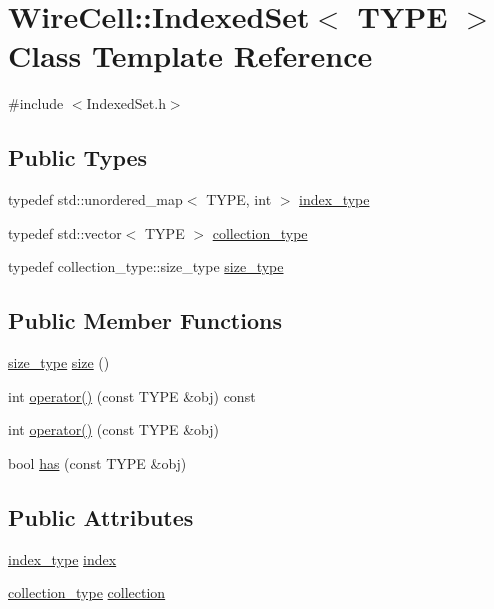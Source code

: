 \hypertarget{class_wire_cell_1_1_indexed_set}{}\section{Wire\+Cell\+:\+:Indexed\+Set$<$ T\+Y\+PE $>$ Class Template Reference}
\label{class_wire_cell_1_1_indexed_set}


{\ttfamily \#include $<$Indexed\+Set.\+h$>$}

\subsection*{Public Types}
\begin{DoxyCompactItemize}
\item 
typedef std\+::unordered\+\_\+map$<$ T\+Y\+PE, int $>$ \hyperlink{class_wire_cell_1_1_indexed_set_ad9f54ba896d3c199df2cc233f16c5327}{index\+\_\+type}
\item 
typedef std\+::vector$<$ T\+Y\+PE $>$ \hyperlink{class_wire_cell_1_1_indexed_set_afd3398c28ed5729c35664d26d6249ed4}{collection\+\_\+type}
\item 
typedef collection\+\_\+type\+::size\+\_\+type \hyperlink{class_wire_cell_1_1_indexed_set_a0b1e1cffb974f20a89cd9d7cd744d89c}{size\+\_\+type}
\end{DoxyCompactItemize}
\subsection*{Public Member Functions}
\begin{DoxyCompactItemize}
\item 
\hyperlink{class_wire_cell_1_1_indexed_set_a0b1e1cffb974f20a89cd9d7cd744d89c}{size\+\_\+type} \hyperlink{class_wire_cell_1_1_indexed_set_a0c8ab3f7c64d74b83677c2891356de93}{size} ()
\item 
int \hyperlink{class_wire_cell_1_1_indexed_set_a67b3d17311b46ca4106bf2966e36e239}{operator()} (const T\+Y\+PE \&obj) const
\item 
int \hyperlink{class_wire_cell_1_1_indexed_set_ad42f0e95a68eae037f9b4687c3948009}{operator()} (const T\+Y\+PE \&obj)
\item 
bool \hyperlink{class_wire_cell_1_1_indexed_set_af735cbbadbec12f2729387d200320755}{has} (const T\+Y\+PE \&obj)
\end{DoxyCompactItemize}
\subsection*{Public Attributes}
\begin{DoxyCompactItemize}
\item 
\hyperlink{class_wire_cell_1_1_indexed_set_ad9f54ba896d3c199df2cc233f16c5327}{index\+\_\+type} \hyperlink{class_wire_cell_1_1_indexed_set_a96af7dbb2545b3247831e1150a52b10c}{index}
\item 
\hyperlink{class_wire_cell_1_1_indexed_set_afd3398c28ed5729c35664d26d6249ed4}{collection\+\_\+type} \hyperlink{class_wire_cell_1_1_indexed_set_a1fc4f16507b418ea2b768ff40f5289c8}{collection}
\end{DoxyCompactItemize}


